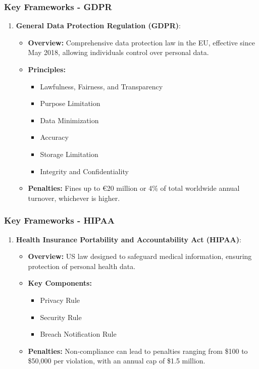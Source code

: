 \documentclass[aspectratio=169]{beamer}
\begin{document}
\begin{frame}[fragile]
    \frametitle{Key Frameworks - GDPR}
    \begin{enumerate}
        \item \textbf{General Data Protection Regulation (GDPR)}:
        \begin{itemize}
            \item \textbf{Overview:} Comprehensive data protection law in the EU, effective since May 2018, allowing individuals control over personal data.
            \item \textbf{Principles:}
                \begin{itemize}
                    \item Lawfulness, Fairness, and Transparency
                    \item Purpose Limitation
                    \item Data Minimization
                    \item Accuracy
                    \item Storage Limitation
                    \item Integrity and Confidentiality
                \end{itemize}
            \item \textbf{Penalties:} Fines up to €20 million or 4\% of total worldwide annual turnover, whichever is higher.
        \end{itemize}
    \end{enumerate}
\end{frame}

\begin{frame}[fragile]
    \frametitle{Key Frameworks - HIPAA}
    \begin{enumerate}
        \item \textbf{Health Insurance Portability and Accountability Act (HIPAA)}:
        \begin{itemize}
            \item \textbf{Overview:} US law designed to safeguard medical information, ensuring protection of personal health data.
            \item \textbf{Key Components:}
                \begin{itemize}
                    \item Privacy Rule
                    \item Security Rule
                    \item Breach Notification Rule
                \end{itemize}
            \item \textbf{Penalties:} Non-compliance can lead to penalties ranging from \$100 to \$50,000 per violation, with an annual cap of \$1.5 million.
        \end{itemize}
    \end{enumerate}
\end{frame}
\end{document}
